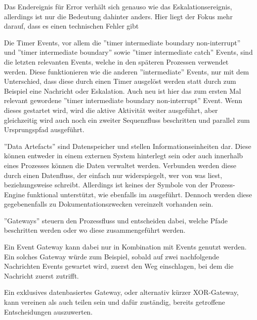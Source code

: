 Das Endereignis für Error verhält sich genauso wie das Eskalationsereignis, allerdings ist nur die Bedeutung dahinter anders. Hier liegt der Fokus mehr darauf, dass es einen technischen Fehler gibt \citep[vgl.][S. 104ff]{bruce_englisch_2011}

Die Timer Events, vor allem die ''timer intermediate boundary non-interrupt'' und ''timer intermediate boundary'' sowie ''timer intermediate catch'' Events, sind die letzten relevanten Events, welche in den späteren Prozessen verwendet werden. Diese funktionieren wie die anderen ''intermediate'' Events, nur mit dem Unterschied, dass diese durch einen Timer ausgelöst werden statt durch zum Beispiel eine Nachricht oder Eskalation. Auch neu ist hier das zum ersten Mal relevant gewordene ''timer intermediate boundary non-interrupt'' Event. Wenn dieses gestartet wird, wird die aktive Aktivität weiter ausgeführt, aber gleichzeitig wird auch noch ein zweiter Sequenzfluss beschritten und parallel zum Ursprungspfad ausgeführt. \citep[vgl.][S. 94]{bruce_englisch_2011}

''Data Artefacts'' sind Datenspeicher und stellen Informationseinheiten dar. Diese können entweder in einem externen System hinterlegt sein oder auch innerhalb eines Prozesses können die Daten verwaltet werden. Verbunden werden diese durch einen Datenfluss, der einfach nur widerspiegelt, wer von was liest, beziehungsweise schreibt. Allerdings ist keines der Symbole von der Prozess-Engine funktional unterstützt, wie ebenfalls im  ausgeführt. Dennoch werden diese gegebenenfalls zu Dokumentationszwecken vereinzelt vorhanden sein. \citep[vgl.][S. 59]{bruce_bpmn_2012}

''Gateways'' steuern den Prozessfluss und entscheiden dabei, welche Pfade beschritten werden oder wo diese zusammengeführt werden.

Ein Event Gateway kann dabei nur in Kombination mit Events genutzt werden. Ein solches Gateway würde zum Beispiel, sobald auf zwei nachfolgende Nachrichten Events gewartet wird, zuerst den Weg einschlagen, bei dem die Nachricht zuerst zutrifft. \citep[vgl.][S. 46]{bruce_bpmn_2012}

Ein exklusives datenbasiertes Gateway, oder alternativ kürzer XOR-Gateway, kann vereinen als auch teilen sein und dafür zuständig, bereits getroffene Entscheidungen auszuwerten. \citep[vgl.][S. 125f]{bruce_englisch_2011}

